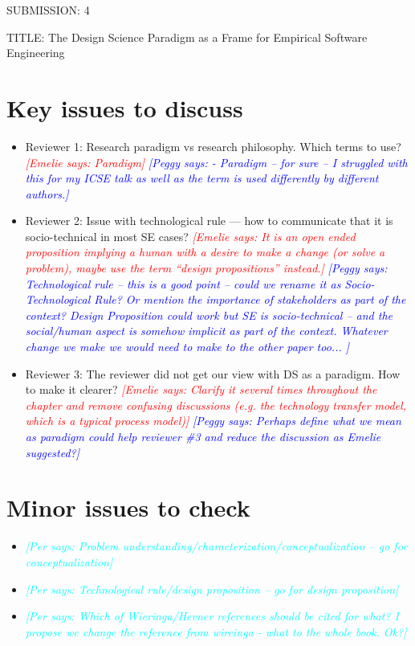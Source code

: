 \documentclass{article}
\newcommand{\emelie}[1]{\textcolor{red}{{\it [Emelie says: #1]}}}
\newcommand{\peggy}[1]{\textcolor{blue}{{\it [Peggy says: #1]}}}
\newcommand{\per}[1]{\textcolor{cyan}{{\it [Per says: #1]}}}
\newcommand{\emelie}[1]{}
\newcommand{\peggy}[1]{}
\newcommand{\per}[1]{}
\begin{document}
SUBMISSION: 4

TITLE: The Design Science Paradigm as a Frame for Empirical Software Engineering

\section*{Key issues to discuss}
\begin{itemize}
\item Reviewer 1: Research paradigm vs research philosophy. Which terms to use?
\emelie{Paradigm}
\peggy{- Paradigm -- for sure -- I struggled with this for my ICSE talk as well as the term is used differently by different authors.}
\item Reviewer 2: Issue with technological rule — how to communicate that it is socio-technical in most SE cases?
\emelie{It is an open ended proposition implying a human with a desire to make a change (or solve a problem), maybe use the term “design propositions” instead.}
\peggy{Technological rule -- this is a good point -- could we rename it as Socio-Technological Rule?  Or mention the importance of stakeholders as part of the context?  Design Proposition could work but SE is socio-technical -- and the social/human aspect is somehow implicit as part of the context.  Whatever change we make we would need to make to the other paper too... }
\item Reviewer 3: The reviewer did not get our view with DS as a paradigm. How to make it clearer?
\emelie{Clarify it several times throughout the chapter and remove confusing discussions (e.g. the technology transfer model, which is a typical process model)}
\peggy{Perhaps define what we mean as paradigm could help reviewer \#3 and reduce the discussion as Emelie suggested?}
\end{itemize}

\section*{Minor issues to check}
\begin{itemize}
\item \per{Problem understanding/characterization/conceptualization -- go for conceptualization}
\item \per{Technological rule/design proposition -- go for design proposition}
\item \per{Which of Wieringa/Hevner references should be cited for what? I propose we change the reference from wireinga - what to the whole book. Ok?}
\end{itemize}
\end{document}
